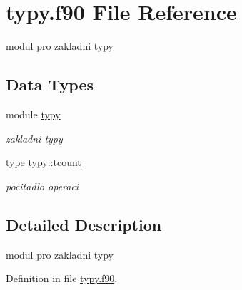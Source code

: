 \hypertarget{typy_8f90}{\section{typy.\-f90 \-File \-Reference}
\label{typy_8f90}
}


modul pro zakladni typy  


\subsection*{\-Data \-Types}
\begin{DoxyCompactItemize}
\item 
module \hyperlink{classtypy}{typy}
\begin{DoxyCompactList}\small\item\em zakladni typy \end{DoxyCompactList}\item 
type \hyperlink{structtypy_1_1tcount}{typy\-::tcount}
\begin{DoxyCompactList}\small\item\em pocitadlo operaci \end{DoxyCompactList}\end{DoxyCompactItemize}


\subsection{\-Detailed \-Description}
modul pro zakladni typy 

\-Definition in file \hyperlink{typy_8f90_source}{typy.\-f90}.

